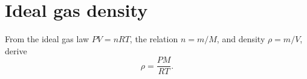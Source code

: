 %
%
%
%

\section*{Ideal gas density}
From the ideal gas law $PV=nRT$, the relation $n=m/M$, and density
$\rho=m/V$, derive
\[
  \rho=\frac{PM}{RT}.
\]

